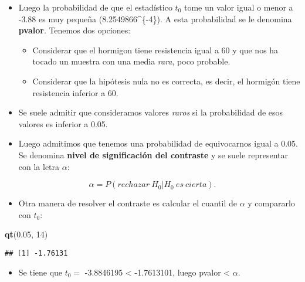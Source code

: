 \documentclass[]{article}
\newenvironment{Shaded}{\begin{snugshade}}{\end{snugshade}}
\newcommand{\KeywordTok}[1]{\textcolor[rgb]{0.13,0.29,0.53}{\textbf{#1}}}
\newcommand{\DecValTok}[1]{\textcolor[rgb]{0.00,0.00,0.81}{#1}}
\newcommand{\FloatTok}[1]{\textcolor[rgb]{0.00,0.00,0.81}{#1}}
\newcommand{\NormalTok}[1]{#1}
\providecommand{\tightlist}{%
  \setlength{\itemsep}{0pt}\setlength{\parskip}{0pt}}
\begin{document}
\begin{itemize}
\tightlist
\item
  Luego la probabilidad de que el estadístico \(t_0\) tome un valor
  igual o menor a -3.88 es muy pequeña (8.2549866\^{}\{-4\}). A
  esta probabilidad se le denomina \textbf{pvalor}. Tenemos dos
  opciones:

  \begin{itemize}
  \tightlist
  \item
    Considerar que el hormigon tiene resistencia igual a 60 y que nos ha
    tocado un muestra con una media \emph{rara}, poco probable.
  \item
    Considerar que la hipótesis nula no es correcta, es decir, el
    hormigón tiene resistencia inferior a 60.
  \end{itemize}
\item
  Se suele admitir que consideramos valores \emph{raros} si la
  probabilidad de esos valores es inferior a 0.05.
\item
  Luego admitimos que tenemos una probabilidad de equivocarnos igual a
  0.05. Se denomina \textbf{nivel de significación del contraste} y se
  suele representar con la letra \(\alpha\):
\end{itemize}

\[
\alpha = P(rechazar \ H_0 | H_0 \ es \ cierta).
\]

\begin{itemize}
\tightlist
\item
  Otra manera de resolver el contraste es calcular el cuantil de
  \(\alpha\) y compararlo con \(t_0\):
\end{itemize}

\begin{Shaded}
\begin{Highlighting}[]
\KeywordTok{qt}\NormalTok{(}\FloatTok{0.05}\NormalTok{, }\DecValTok{14}\NormalTok{)}
\end{Highlighting}
\end{Shaded}

\begin{verbatim}
## [1] -1.76131
\end{verbatim}

\begin{itemize}
\tightlist
\item
  Se tiene que \(t_0=\) -3.8846195 \textless{} -1.7613101, luego pvalor
  \textless{} \(\alpha\).
\end{itemize}
\end{document}
